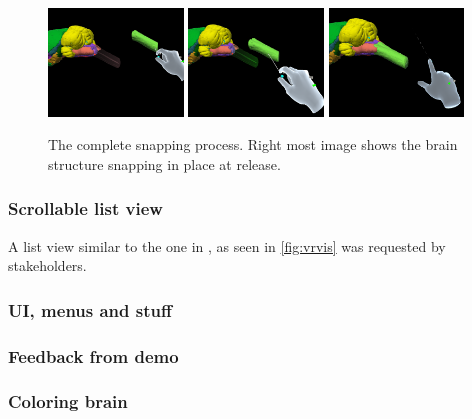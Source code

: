 \begin{figure}
    \centering
    \includegraphics[width=0.32\textwidth]{fig/snaphint1.png}
    \includegraphics[width=0.32\textwidth]{fig/snaphint2.png}
    \includegraphics[width=0.32\textwidth]{fig/snaphint3.png}
    \caption{The complete snapping process. Right most image shows the brain structure snapping in place at release.}
\end{figure}

\subsubsection*{Scrollable list view}

A list view similar to the one in , as seen in \autoref{fig:vrvis} was requested by stakeholders. 


\subsubsection*{UI, menus and stuff }


\subsubsection*{Feedback from demo}

\subsubsection*{Coloring brain}

